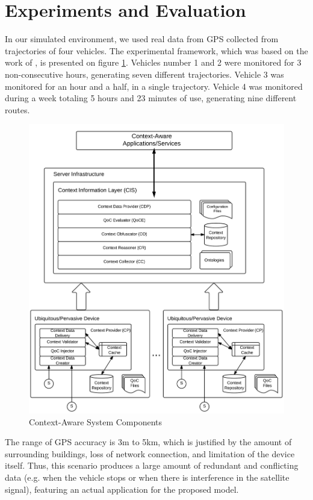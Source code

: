 \documentclass[letterpaper,conference]{IEEEtran}
\begin{document}
\section{Experiments and Evaluation}

  In our simulated environment, we used real data from GPS collected from trajectories 
  of four vehicles. The experimental framework, which was based on the work of 
  \cite{martin2009generalized}, is presented on figure \ref{contextcomp}. Vehicles 
  number 1 and 2 were monitored for 3 non-consecutive hours, generating seven different 
  trajectories. Vehicle 3 was monitored for an hour and a half, in a single trajectory.
  Vehicle 4 was monitored during a week totaling 5 hours and 23 minutes of use, 
  generating nine different routes. 
  
   \begin{figure}[!ht]
  \centering
   \includegraphics[scale=0.107]{imagens/ContextPlatform}
  \caption{Context-Aware System Components}
  \label{contextcomp}
 \end{figure}
  
  The range of GPS accuracy is 3m to 5km, which is justified by the amount of 
  surrounding buildings, loss of network connection, and limitation of the device itself.
  Thus, this scenario produces a large amount of redundant and conflicting data (e.g. 
  when the vehicle stops or when there is interference in the satellite signal), 
  featuring an actual application for the proposed model. 
\end{document}
